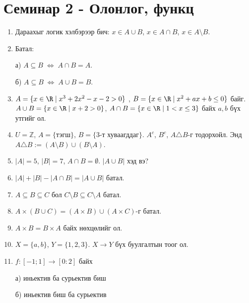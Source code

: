 \section*{Семинар 2 - Олонлог, функц}
\begin{enumerate}
  \item Дараахыг логик хэлбэрээр бич: $x\in A\cup B$, $x\in A\cap B$, $x\in A\setminus B$.
  \item Батал: 
  
  а) $A\subseteq B\;\Leftrightarrow\;A\cap B=A$.

  
  б) $A\subseteq B\;\Leftrightarrow\;A\cup B=B$.
  \item $A=\{x\in\R\mid x^3+2x^2-x-2>0\}$ , $B=\{x\in\R\mid x^2+ax+b\leq 0\}$ байг. $A\cup B=\{x\in\R\mid x+2>0\}$,  $A\cap B=\{x\in\R\mid 1<x\leq 3\}$ байх $a,b$ бүх утгийг ол.
  \item $U=\mathbb{Z}$, $A=\{\text{тэгш}\}$, $B=\{\text{3-т хуваагддаг}\}$. $A^c$, $B^c$, $A\triangle B$-г тодорхойл. Энд $A\triangle B:= (A\setminus B)\cup (B\setminus A)$.
  \item $|A|=5$, $|B|=7$, $A\cap B=\emptyset$. $|A\cup B|$ хэд вэ?
  \item $|A|+|B|-|A\cap B|=|A\cup B|$ батал.
  \item $A\subseteq B\subseteq C$ бол  $C\setminus B\subseteq C\setminus A$ батал.
  \item $A\times(B\cup C)=(A\times B)\cup(A\times C)$-г батал.
  \item $A\times B=B\times A$ байх нөхцөлийг ол.
  \item $X=\{a,b\}$, $Y=\{1,2,3\}$. $X\to Y$ бүх буулгалтын тоог ол. 
  \item $f:[-1;1]\to [0:2]$ байх 
  
  а) иньектив ба сурьектив биш 
  
  б) иньектив биш ба сурьектив 
  

\end{enumerate}
